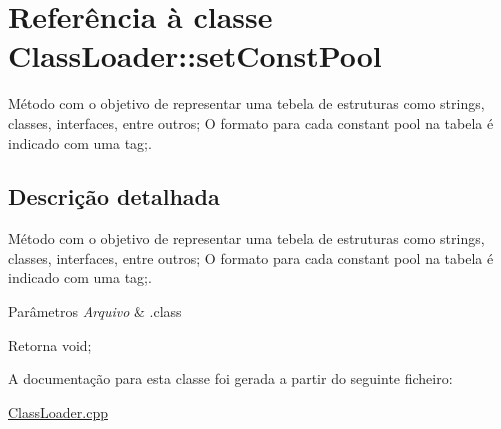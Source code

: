 \hypertarget{class_class_loader_1_1set_const_pool}{}\section{Referência à classe Class\+Loader\+:\+:set\+Const\+Pool}
\label{class_class_loader_1_1set_const_pool}


Método com o objetivo de representar uma tebela de estruturas como strings, classes, interfaces, entre outros; O formato para cada constant pool na tabela é indicado com uma tag;.  




\subsection{Descrição detalhada}
Método com o objetivo de representar uma tebela de estruturas como strings, classes, interfaces, entre outros; O formato para cada constant pool na tabela é indicado com uma tag;. 


\begin{DoxyParams}{Parâmetros}
{\em Arquivo} & .class \\
\hline
\end{DoxyParams}
\begin{DoxyReturn}{Retorna}
void; 
\end{DoxyReturn}


A documentação para esta classe foi gerada a partir do seguinte ficheiro\+:\begin{DoxyCompactItemize}
\item 
\hyperlink{_class_loader_8cpp}{Class\+Loader.\+cpp}\end{DoxyCompactItemize}
